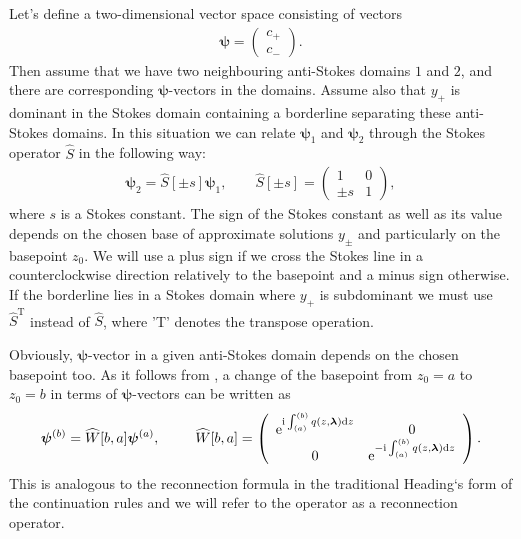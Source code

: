 \documentclass[12pt]{iopart}
\def\S{\widehat{S}}
\def\W{\widehat{W}}
\def\psii{\bm\psi}
\def\lmbd{\bm{\lambda}}
\def\Tp{\mathrm{T}}
\newcommand\phsintgrnd[1][z]{q(#1,\lmbd)}
\newcommand\phsintgrl[3][z]{\int_{#2}^{#3} \phsintgrnd[#1] \rmd #1}
\begin{document}
Let's define a two-dimensional vector space consisting of vectors
\begin{eqnarray}
\psii= \left(\begin{array}{*{2}{c}} c_+ \\ c_- \end{array}\right).
\end{eqnarray}
Then assume that we have two neighbouring anti-Stokes domains $1$ and $2$, and there are 
corresponding $\psii$-vectors in the domains. Assume also that $y_+$ is dominant in the Stokes 
domain containing a borderline separating these anti-Stokes domains. 
In this situation we can relate $\psii_1$ and $\psii_2$ through the Stokes 
operator $\S$ in the following way:
\begin{eqnarray}
\psii_2 = \S[\pm s] \psii_1, \qquad 
\S[\pm s] = \left(\begin{array}{*{2}{c}} 1 & 0 \\ \pm s & 1 \end{array}\right),    
\end{eqnarray}
where $s$ is a Stokes constant. The sign of the Stokes constant as well as its value 
depends on the chosen base of approximate solutions $y_\pm$ and particularly on the 
basepoint $z_0$. We will use a plus sign if we cross the Stokes line in a counterclockwise 
direction relatively to the basepoint and a minus sign otherwise. If the borderline lies in 
a Stokes domain where $y_+$ is subdominant we must use $\S^{\Tp}$ instead of $\S$, where 'T' 
denotes the transpose operation.

Obviously, $\psii$-vector in a given anti-Stokes domain depends on the chosen basepoint too. 
As it follows from , a change of the basepoint from $z_0=a$ to $z_0=b$ in 
terms of $\psii$-vectors can be written as
\begin{eqnarray}
\psii^{(b)} = \W[b,a] \psii^{(a)}, \qquad 
\W[b,a] =  
\left(\begin{array}{*{2}{c}}
\rme^{\rmi \phsintgrl{(a)}{(b)}} & 0 \\ 0 & \rme^{-\rmi \phsintgrl{(a)}{(b)}} 
\end{array}\right).
\end{eqnarray}
This is analogous to the reconnection formula in the traditional Heading`s form of the continuation 
rules and we will refer to the operator as a reconnection operator.
\end{document}
